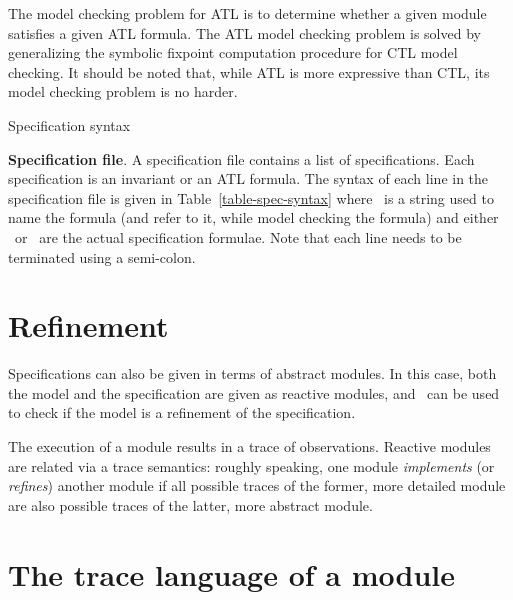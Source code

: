 The model checking problem for ATL is to determine whether a given module
satisfies a given ATL formula. 
The ATL model checking problem is solved by generalizing the symbolic fixpoint
computation procedure for CTL model checking.
It should be noted that, while ATL is more expressive than CTL,
its model checking problem is no harder.

\begin{table}\boxed{
\begin{tabbing}
\specline\ \gramdef\ \= \inv\ \formulaname\ \invFormula\ \SEMICOLON \\
                     \> $|$ \atl\ \formulaname\ \pathFormula\ \SEMICOLON \\[3ex]
\formulaname\ \gramdef\ \ident
\end{tabbing}}
\caption{Specification syntax}
\label{table-spec-syntax}
\end{table}

\mypar
{\bf Specification file}.
A specification file contains a list of specifications. 
Each specification is an invariant or an ATL formula. The syntax
of each line in the specification file is given in Table~\ref{table-spec-syntax}
where \formulaname\ is a string used to name the formula (and refer to it,
while model checking the formula) and either \invFormula\ or \pathFormula\ are the actual
specification formulae. Note that each line needs to be terminated using a semi-colon.

\section{Refinement}
Specifications can also be given in terms of abstract modules. In this
case, both the model and the specification are given as reactive modules,
and \mocha\ can be used to check if the model is a refinement of the
specification.


The execution of a module results in a trace of observations.
Reactive modules are related via a trace semantics:
roughly speaking, one module {\em implements\/} (or {\em refines\/}) another
module if all possible traces of the former, more detailed module are also
possible traces of the latter, more abstract module.


\section{The trace language of a module}

